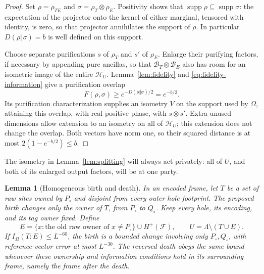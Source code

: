 \documentclass[11pt]{article}
\numberwithin{equation}{section}
\newtheorem{lemma}[theorem]{Lemma}
\theoremstyle{definition}
\theoremstyle{remark}
\begin{document}
\begin{proof}
Set $\rho=\rho_{TE}$ and $\sigma=\rho_T\otimes\rho_E$.  Positivity shows
that $\operatorname{supp}\rho\subseteq\operatorname{supp}\sigma$: the expectation of the projector
onto the kernel of either marginal, tensored with identity, is zero, so
that projector annihilates the support of $\rho$.  In particular
$D(\rho\Vert\sigma)=b$ is well defined on this support.

Choose separate purifications $s$ of $\rho_T$ and $s'$ of $\rho_E$.  Enlarge
their purifying factors, if necessary by appending pure ancillas, so that
$\mathcal B_T\otimes\mathcal B_E$ also has room for an isometric image of
the entire $\mathcal H_U$.  Lemma~\ref{lem:fidelity} and
\eqref{eq:fidelity-information} give a purification overlap
\[
 F(\rho,\sigma)\ge e^{-D(\rho\Vert\sigma)/2}=e^{-b/2}.
\]
Its purification characterization supplies an isometry $V$ on the support
used by $\Omega$, attaining this overlap, with real positive phase, with
$s\otimes s'$.  Extra unused dimensions allow extension to an isometry on
all of $\mathcal H_U$; this extension does not change the overlap.  Both
vectors have norm one, so their squared distance is at most
$2(1-e^{-b/2})\le b$.
\end{proof}

The isometry in Lemma~\ref{lem:splitting} will always act privately: all of
$U$, and both of its enlarged output factors, will be at one party.

\begin{lemma}[Homogeneous birth and death]\label{lem:birth}
In an encoded frame, let $T$ be a set of raw sites owned by $P_\circ$ and
disjoint from every outer hole footprint.  The proposed birth changes only
the owner of $T$, from $P_\circ$ to $Q_\circ$.  Keep every hole, its encoding,
and its tag owner fixed.  Define
\begin{equation}\label{eq:birth-partition}
 E=\{x:\text{the old raw owner of }x\ne P_\circ\}
        \cup H^+(\mathcal F),\qquad
 U=\Lambda\setminus(T\cup E).
\end{equation}
If $I_\Omega(T:E)\le L^{-60}$, the birth is a bounded change involving
only $P_\circ,Q_\circ$, with reference-vector error at most $L^{-30}$.
The reversed death obeys the same bound whenever these ownership and
information conditions hold in its surrounding frame, namely the frame
\emph{after} the death.
\end{lemma}
\end{document}
